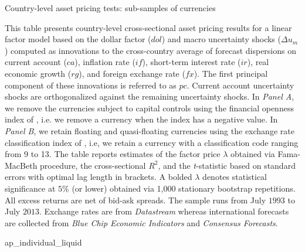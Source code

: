 \begin{landscape}
	\begin{table}[ht]
		\caption{Country-level asset pricing tests: sub-samples of currencies} \label{tab:ap_individual_liquid}
		\begin{footnotesize}
			This table presents country-level cross-sectional asset pricing results for a linear factor model based on the dollar factor ($dol$) and macro uncertainty shocks ($\Delta u_{m}$) computed as innovations to the cross-country average of forecast dispersions on current account ($ca$), inflation rate ($if$), short-term interest rate ($ir$), real economic growth ($rg$), and foreign exchange rate ($fx$). The first principal component of these innovations is referred to as $pc$. Current account uncertainty shocks are orthogonalized against the remaining uncertainty shocks. In \emph{Panel A}, we remove the currencies subject to capital controls using the financial openness index of \citet{chinn_ito/06}, i.e. we remove a currency when the index has a negative value. In \emph{Panel B}, we retain floating and quasi-floating currencies using the exchange rate classification index of \citet{IRR/2011}, i.e, we retain a currency with a classification code ranging from 9 to 13. The table reports estimates of the factor price $\lambda$ obtained via Fama-MacBeth procedure, the cross-sectional $R^{2}$, and the \emph{t}-statistic based on \citet{newey_west1987} standard errors with \citet{andrews1991} optimal lag length in brackets. A bolded $\lambda$ denotes statistical significance at $5\%$ (or lower) obtained via 1,000 stationary bootstrap repetitions. All excess returns are net of bid-ask spreads. The sample runs from July $1993$ to July $2013$. Exchange rates are from \textit{Datastream} whereas international forecasts are collected from \textit{Blue Chip Economic Indicators} and \textit{Consensus Forecasts}.
		\end{footnotesize}
		
		{ap_individual_liquid}
		
	\end{table}	
\end{landscape}



